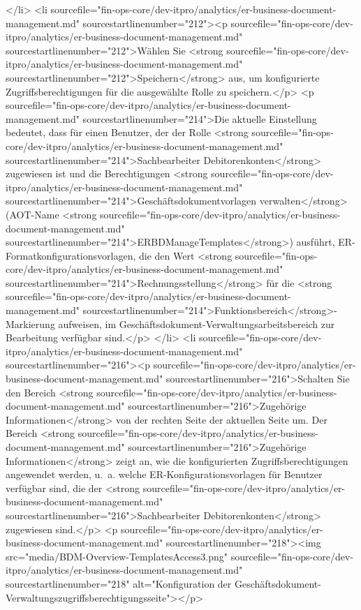 </li>
<li sourcefile="fin-ops-core/dev-itpro/analytics/er-business-document-management.md" sourcestartlinenumber="212"><p sourcefile="fin-ops-core/dev-itpro/analytics/er-business-document-management.md" sourcestartlinenumber="212">Wählen Sie <strong sourcefile="fin-ops-core/dev-itpro/analytics/er-business-document-management.md" sourcestartlinenumber="212">Speichern</strong> aus, um konfigurierte Zugriffsberechtigungen für die ausgewählte Rolle zu speichern.</p>
<p sourcefile="fin-ops-core/dev-itpro/analytics/er-business-document-management.md" sourcestartlinenumber="214">Die aktuelle Einstellung bedeutet, dass für einen Benutzer, der der Rolle <strong sourcefile="fin-ops-core/dev-itpro/analytics/er-business-document-management.md" sourcestartlinenumber="214">Sachbearbeiter Debitorenkonten</strong> zugewiesen ist und die Berechtigungen <strong sourcefile="fin-ops-core/dev-itpro/analytics/er-business-document-management.md" sourcestartlinenumber="214">Geschäftsdokumentvorlagen verwalten</strong> (AOT-Name <strong sourcefile="fin-ops-core/dev-itpro/analytics/er-business-document-management.md" sourcestartlinenumber="214">ERBDManageTemplates</strong>) ausführt, ER-Formatkonfigurationsvorlagen, die den Wert <strong sourcefile="fin-ops-core/dev-itpro/analytics/er-business-document-management.md" sourcestartlinenumber="214">Rechnungsstellung</strong> für die <strong sourcefile="fin-ops-core/dev-itpro/analytics/er-business-document-management.md" sourcestartlinenumber="214">Funktionsbereich</strong>-Markierung aufweisen, im Geschäftsdokument-Verwaltungsarbeitsbereich zur Bearbeitung verfügbar sind.</p>
</li>
<li sourcefile="fin-ops-core/dev-itpro/analytics/er-business-document-management.md" sourcestartlinenumber="216"><p sourcefile="fin-ops-core/dev-itpro/analytics/er-business-document-management.md" sourcestartlinenumber="216">Schalten Sie den Bereich <strong sourcefile="fin-ops-core/dev-itpro/analytics/er-business-document-management.md" sourcestartlinenumber="216">Zugehörige Informationen</strong> von der rechten Seite der aktuellen Seite um. Der Bereich <strong sourcefile="fin-ops-core/dev-itpro/analytics/er-business-document-management.md" sourcestartlinenumber="216">Zugehörige Informationen</strong> zeigt an, wie die konfigurierten Zugriffsberechtigungen angewendet werden, u. a. welche ER-Konfigurationsvorlagen für Benutzer verfügbar sind, die der <strong sourcefile="fin-ops-core/dev-itpro/analytics/er-business-document-management.md" sourcestartlinenumber="216">Sachbearbeiter Debitorenkonten</strong> zugewiesen sind.</p>
<p sourcefile="fin-ops-core/dev-itpro/analytics/er-business-document-management.md" sourcestartlinenumber="218"><img src="media/BDM-Overview-TemplatesAccess3.png" sourcefile="fin-ops-core/dev-itpro/analytics/er-business-document-management.md" sourcestartlinenumber="218" alt="Konfiguration der Geschäftsdokument-Verwaltungszugriffsberechtigungsseite"></p>

